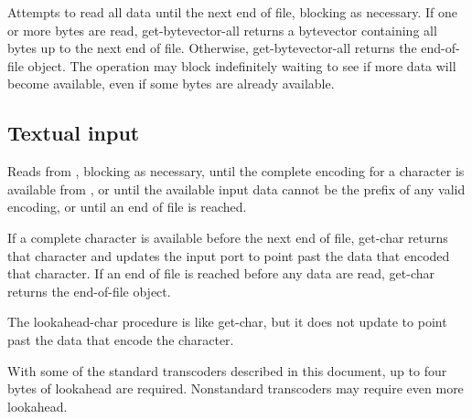 \begin{entry}{%
}
   
Attempts to read all data until the next end of file, blocking as
necessary. If one or more bytes are read, {\cf get-bytevector-all} returns
a bytevector
containing all bytes up to the next end of file.  Otherwise, {\cf
  get-bytevector-all} returns the end-of-file object.
The operation may block indefinitely waiting to see if more data
will become available, even if some bytes are already available.
\end{entry}

\subsection{Textual input}

\begin{entry}{%
}
   
Reads from , blocking as necessary, until the
complete encoding for a character is available from ,
or until the available input data cannot be the prefix of any valid encoding,
or until an end of file is reached.

If a complete character is available before the next end of file, {\cf
  get-char} returns that character and updates the input port to
point past the data that encoded that character. If an end of file is
reached before any data are read, {\cf get-char} returns the
end-of-file object.
\end{entry}

\begin{entry}{%
}
  
The {\cf lookahead-char} procedure is like {\cf get-char}, but it does not 
update  to point past the data
that encode the character.

\begin{note}
  With some of the standard transcoders
  described in this document, up to four bytes of lookahead are
  required. Nonstandard transcoders may require even more lookahead.
\end{note}
\end{entry}

